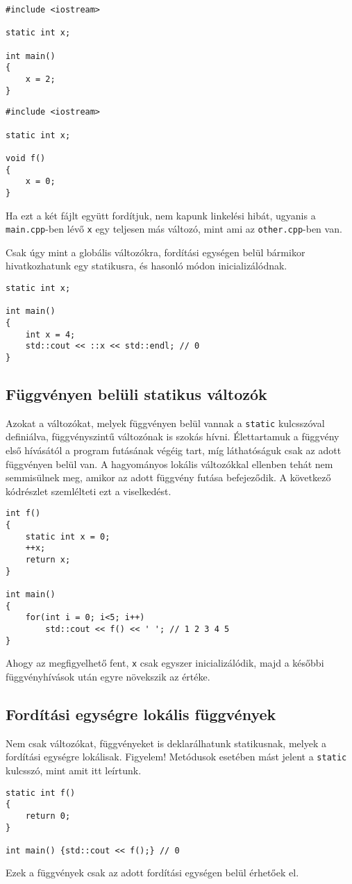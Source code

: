 \documentclass[a4paper,11.5pt,table]{article}
\begin{document}
	\begin{lstlisting}
#include <iostream>

static int x;

int main()
{
	x = 2;
}
	\end{lstlisting}
	\medskip
	
	\begin{lstlisting}
#include <iostream>

static int x;

void f()
{
	x = 0;
}
	\end{lstlisting}
	Ha ezt a két fájlt együtt fordítjuk, nem kapunk linkelési hibát, ugyanis a \texttt{main.cpp}-ben lévő \texttt{x} egy teljesen más változó, mint ami az \texttt{other.cpp}-ben van.
	
	\smallskip
	Csak úgy mint a globális változókra, fordítási egységen belül bármikor hivatkozhatunk egy statikusra, és hasonló módon inicializálódnak.
	\begin{lstlisting}
static int x;

int main()
{
	int x = 4;
	std::cout << ::x << std::endl; // 0
}
	\end{lstlisting}
	\subsection{Függvényen belüli statikus változók}
	Azokat a változókat, melyek függvényen belül vannak a \texttt{static} kulcsszóval definiálva, függvényszintű változónak is szokás hívni. Élettartamuk a függvény első hívásától a program futásának végéig tart, míg láthatóságuk csak az adott függvényen belül van. A hagyományos lokális változókkal ellenben tehát nem semmisülnek meg, amikor az adott függvény futása befejeződik. A következő kódrészlet szemlélteti ezt a viselkedést.
	
	\begin{lstlisting}
int f()
{
	static int x = 0;
	++x;
	return x;
}

int main() 
{
	for(int i = 0; i<5; i++)
		std::cout << f() << ' '; // 1 2 3 4 5
}
	\end{lstlisting}
	Ahogy az megfigyelhető fent, \texttt{x} csak egyszer inicializálódik, majd a későbbi függvényhívások után egyre növekszik az értéke.
	\subsection{Fordítási egységre lokális függvények}
  Nem csak változókat, függvényeket is deklarálhatunk statikusnak, melyek a fordítási egységre lokálisak. Figyelem! Metódusok esetében mást jelent a \texttt{static} kulcsszó, mint amit itt leírtunk.
	\begin{lstlisting}
static int f()
{
	return 0;
}

int main() {std::cout << f();} // 0
	\end{lstlisting}
	Ezek a függvények csak az adott fordítási egységen belül érhetőek el.
\end{document}
